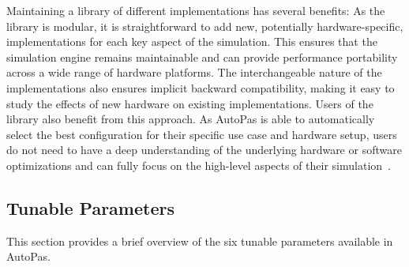 \documentclass[conference]{IEEEtran}
\begin{document}
Maintaining a library of different implementations has several benefits: As the library is modular, it is straightforward to add new, potentially hardware-specific, implementations for each key aspect of the simulation. This ensures that the simulation engine remains maintainable and can provide performance portability across a wide range of hardware platforms. The interchangeable nature of the implementations also ensures implicit backward compatibility, making it easy to study the effects of new hardware on existing implementations. Users of the library also benefit from this approach. As AutoPas is able to automatically select the best configuration for their specific use case and hardware setup, users do not need to have a deep understanding of the underlying hardware or software optimizations and can fully focus on the high-level aspects of their simulation~\cite{Tchipev2020}\cite{Gratl2022AutoPas}.

\subsection{Tunable Parameters}

This section provides a brief overview of the six tunable parameters available in AutoPas.
\end{document}
